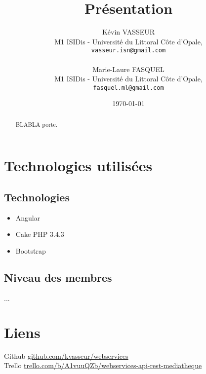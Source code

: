\documentclass{article}
\title{Pr\'{e}sentation}
\author{K\'{e}vin VASSEUR\\
   M1 ISIDis - Universit\'{e} du Littoral C\^{o}te d'Opale,\\
   \texttt{vasseur.isn@gmail.com}\\
   \\
   Marie-Laure FASQUEL\\
   M1 ISIDis - Universit\'{e} du Littoral C\^{o}te d'Opale,\\
   \texttt{fasquel.ml@gmail.com}
}
\date{\today}
\begin{document}
	\maketitle
	\begin{abstract}
		BLABLA porte.
	\end{abstract}	
	\section{Technologies utilis\'{e}es}
		\subsection{Technologies}
			\begin{itemize}
				\item Angular
				\item Cake PHP 3.4.3
				\item Bootstrap
			\end{itemize}
			
		\subsection{Niveau des membres}
		...
		
	\section{Liens}
	Github \href{https://github.com/kvasseur/webservices}{github.com/kvasseur/webservices} \\
	Trello \href{https://trello.com/b/A1vuuQZb/webservices-api-rest-mediatheque}{trello.com/b/A1vuuQZb/webservices-api-rest-mediatheque}
\end{document}
